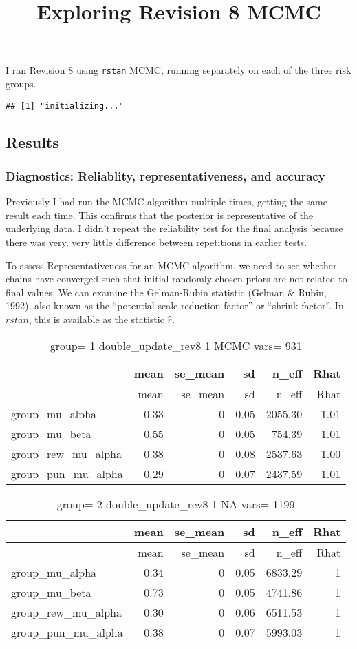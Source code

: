 \documentclass[]{article}
\title{Exploring Revision 8 MCMC}
\author{}
\date{}
\begin{document}
\maketitle

I ran Revision 8 using \texttt{rstan} MCMC, running separately on each
of the three risk groups.

\begin{verbatim}
## [1] "initializing..."
\end{verbatim}

\subsection{Results}\label{results}

\subsubsection{Diagnostics: Reliablity, representativeness, and
accuracy}\label{diagnostics-reliablity-representativeness-and-accuracy}

Previously I had run the MCMC algorithm multiple times, getting the same
result each time. This confirms that the posterior is representative of
the underlying data. I didn't repeat the reliability test for the final
analysis because there was very, very little difference between
repetitions in earlier tests.

To assess Representativeness for an MCMC algorithm, we need to see
whether chains have converged such that initial randomly-chosen priors
are not related to final values. We can examine the Gelman-Rubin
statistic (Gelman \& Rubin, 1992), also known as the ``potential scale
reduction factor'' or ``shrink factor''. In \(rstan\), this is available
as the statistic \(\widehat{r}\).

\begin{longtable}[]{@{}lrrrrr@{}}
\caption{group= 1 double\_update\_rev8 1 MCMC vars= 931}\tabularnewline
\toprule
& mean & se\_mean & sd & n\_eff & Rhat\tabularnewline
\midrule
\endfirsthead
\toprule
& mean & se\_mean & sd & n\_eff & Rhat\tabularnewline
\midrule
\endhead
group\_mu\_alpha & 0.33 & 0 & 0.05 & 2055.30 & 1.01\tabularnewline
group\_mu\_beta & 0.55 & 0 & 0.05 & 754.39 & 1.01\tabularnewline
group\_rew\_mu\_alpha & 0.38 & 0 & 0.08 & 2537.63 & 1.00\tabularnewline
group\_pun\_mu\_alpha & 0.29 & 0 & 0.07 & 2437.59 & 1.01\tabularnewline
\bottomrule
\end{longtable}

\begin{longtable}[]{@{}lrrrrr@{}}
\caption{group= 2 double\_update\_rev8 1 NA vars= 1199}\tabularnewline
\toprule
& mean & se\_mean & sd & n\_eff & Rhat\tabularnewline
\midrule
\endfirsthead
\toprule
& mean & se\_mean & sd & n\_eff & Rhat\tabularnewline
\midrule
\endhead
group\_mu\_alpha & 0.34 & 0 & 0.05 & 6833.29 & 1\tabularnewline
group\_mu\_beta & 0.73 & 0 & 0.05 & 4741.86 & 1\tabularnewline
group\_rew\_mu\_alpha & 0.30 & 0 & 0.06 & 6511.53 & 1\tabularnewline
group\_pun\_mu\_alpha & 0.38 & 0 & 0.07 & 5993.03 & 1\tabularnewline
\bottomrule
\end{longtable}
\end{document}
